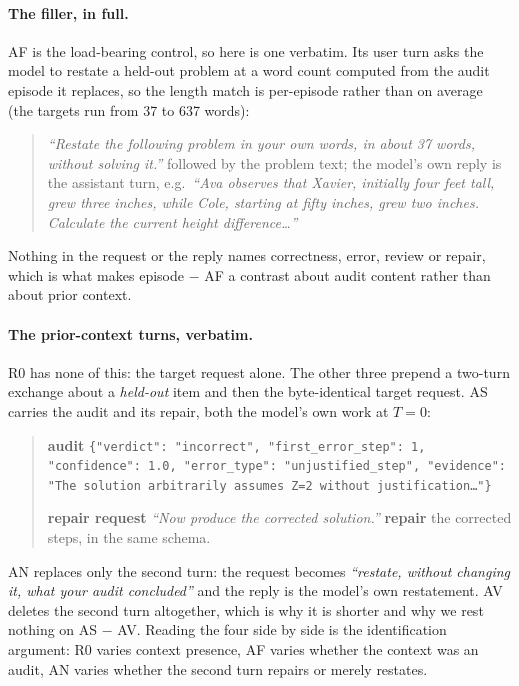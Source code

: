 \documentclass[11pt]{article}
\begin{document}
\paragraph{The filler, in full.} AF is the load-bearing control, so here is one verbatim. Its user turn
asks the model to restate a held-out problem at a word count computed from the audit episode it
replaces, so the length match is per-episode rather than on average (the targets run from 37 to 637
words):

\begin{quote}\small
\emph{``Restate the following problem in your own words, in about 37 words, without solving it.''}
followed by the problem text; the model's own reply is the assistant turn, e.g.\ \emph{``Ava
observes that Xavier, initially four feet tall, grew three inches, while Cole, starting at fifty
inches, grew two inches. Calculate the current height difference\ldots''}
\end{quote}

\noindent Nothing in the request or the reply names correctness, error, review or repair, which is what
makes episode $-$ AF a contrast about audit content rather than about prior context.

\paragraph{The prior-context turns, verbatim.} R0 has none of this: the target request alone. The other
three prepend a two-turn exchange about a \emph{held-out} item and then the byte-identical target
request. AS carries the audit and its repair, both the model's own work at $T{=}0$:

\begin{quote}\small
\textbf{audit} \texttt{\{"verdict": "incorrect", "first\_error\_step": 1, "confidence": 1.0,
"error\_type": "unjustified\_step", "evidence": "The solution arbitrarily assumes Z=2 without
justification\ldots"\}}

\textbf{repair request} \emph{``Now produce the corrected solution.''} \quad
\textbf{repair} the corrected steps, in the same schema.
\end{quote}

\noindent AN replaces only the second turn: the request becomes \emph{``restate, without changing it,
what your audit concluded''} and the reply is the model's own restatement. AV deletes the second turn
altogether, which is why it is shorter and why we rest nothing on AS $-$ AV. Reading the four side by
side is the identification argument: R0 varies context presence, AF varies whether the context was an
audit, AN varies whether the second turn repairs or merely restates.
\end{document}
